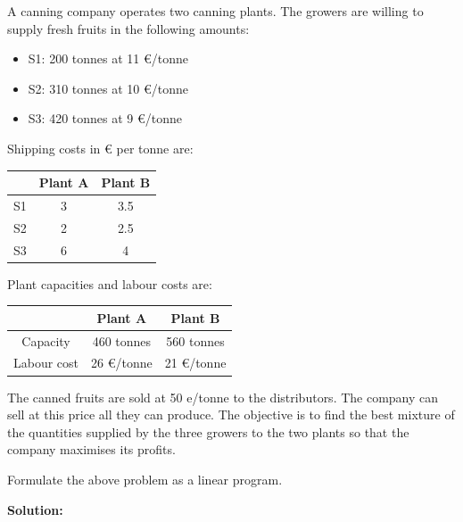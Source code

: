 \documentclass[a4paper,10pt]{article}
\begin{document}
 A canning company operates two canning plants. The growers are willing to supply fresh fruits
in the following amounts:
\begin{itemize}
    \item S1: 200 tonnes at 11 $\euro$/tonne
    \item S2: 310 tonnes at 10 $\euro$/tonne
    \item S3: 420 tonnes at 9 $\euro$/tonne
\end{itemize}

Shipping costs in $\euro$ per tonne are:

\begin{table}[H]
\centering
\begin{tabular}{|c|c|c|}
\hline
& Plant A & Plant B \\
\hline
S1 & 3 & 3.5 \\
\hline
S2 & 2 & 2.5 \\
\hline
S3 & 6 & 4 \\
\hline
\end{tabular}
\end{table}

Plant capacities and labour costs are:

\begin{table}[H]
\centering
\begin{tabular}{|c|c|c|}
\hline
& Plant A & Plant B \\
\hline
Capacity & 460 tonnes & 560 tonnes \\
\hline
Labour cost & 26 \euro/tonne & 21 \euro/tonne \\
\hline
\end{tabular}
\end{table}

The canned fruits are sold at 50 e/tonne to the distributors. The company can sell at this price
all they can produce. The objective is to find the best mixture of the quantities supplied by the
three growers to the two plants so that the company maximises its profits.


Formulate the above problem as a linear program.

\medskip
\textbf{Solution:}
\end{document}
